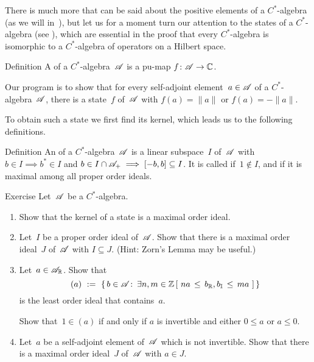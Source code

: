 \documentclass[a]{subfiles}
\begin{document}
\begin{parsec}%
\begin{point}%
There is much more that can be said
about the positive elements of a $C^*$-algebra
(as we will in~),
but let us for a moment
turn our attention to the states of a $C^*$-algebra
(see ),
which are
essential
in the proof that every $C^*$-algebra
is isomorphic to a $C^*$-algebra of operators on a Hilbert space.
\end{point}
\begin{point}[state]{Definition}%
A  of a $C^*$-algebra~$\mathscr{A}$
is a pu-map $f\colon \mathscr{A}\to \mathbb{C}$.
\end{point}
\begin{point}%
Our program is to show that 
for every self-adjoint element~$a\in \mathscr{A}$
of a $C^*$-algebra~$\mathscr{A}$,
there is a state~$f$ of~$\mathscr{A}$ with $f(a)=\|a\|$ or $f(a)=-\|a\|$.

To obtain such a state
we first find its kernel,
which leads us to the following definitions.
\end{point}
\begin{point}{Definition}%
An 
of a $C^*$-algebra~$\mathscr{A}$
is a linear subspace~$I$ of~$\mathscr{A}$
with $b\in I\implies b^*\in I$
and $b\in I\cap\mathscr{A}_{+}\implies [-b,b]\subseteq I$.
It is called  if~$1\notin I$,
and  if it is maximal among all proper order ideals.
\end{point}
\begin{point}{Exercise}%
Let~$\mathscr{A}$ be a $C^*$-algebra.
\begin{enumerate}
\item
Show that the kernel of a state is a maximal order ideal.
\item
Let~$I$ be a proper order ideal of~$\mathscr{A}$.
Show that there is a maximal 
order ideal~$J$ of~$\mathscr{A}$ with $I\subseteq J$.
(Hint: Zorn's Lemma may be useful.)
\item
Let~$a\in \mathscr{A}_{\mathbb{R}}$.
Show that 
\begin{equation*}
(a)\ := \ \{\, b\in \mathscr{A}\colon\, \exists n,m\in \mathbb{Z}\,
[\ na \,\leq\, b_{\mathbb{R}},b_{\mathbb{I}}\,\leq\, ma\ ]\,\}
\end{equation*}
is the least order ideal that contains~$a$.

Show that~$1\in (a)$ if and only if $a$ is invertible
and either $0\leq a$ or $a\leq 0$.

\item
Let~$a$ be a self-adjoint element of~$\mathscr{A}$ which
is not invertible.
Show that there is a maximal order ideal~$J$
of~$\mathscr{A}$
with $a\in J$.


\end{enumerate}
\end{point}
\end{parsec}
\end{document}
